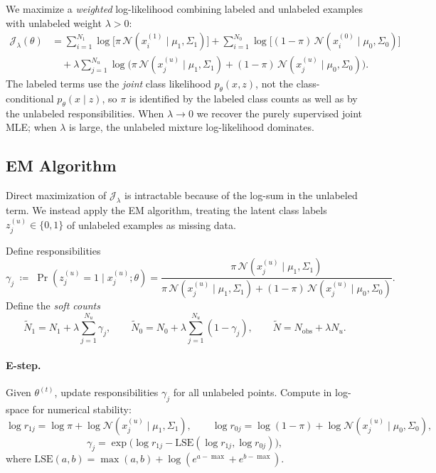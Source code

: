 \documentclass[11pt]{article}
\theoremstyle{definition}
\newcommand{\calJ}{\mathcal{J}}
\newcommand{\calN}{\mathcal{N}}
\newcommand{\lam}{\lambda}
\newcommand{\Sig}{\Sigma}
\newcommand{\LSE}{\mathrm{LSE}}
\begin{document}
We maximize a \emph{weighted} log-likelihood combining labeled
and unlabeled examples with unlabeled weight \(\lam>0\):
\begin{align}
\calJ_\lam(\theta)
&= \sum_{i=1}^{N_1}\log\!\Big[\pi\,\calN(x_i^{(1)}\mid \mu_1,\Sig_1)\Big]
 + \sum_{i=1}^{N_0}\log\!\Big[(1-\pi)\,\calN(x_i^{(0)}\mid \mu_0,\Sig_0)\Big] \nonumber\\
&\quad + \lam \sum_{j=1}^{N_u}\log\!\Big(
\pi\,\calN(x_j^{(u)}\mid \mu_1,\Sig_1) + (1-\pi)\,\calN(x_j^{(u)}\mid \mu_0,\Sig_0)
\Big). \label{eq:weighted-ll}
\end{align}
The labeled terms use the \emph{joint} class likelihood
\(p_\theta(x,z)\), not the class-conditional \(p_\theta(x\mid z)\),
so \(\pi\) is identified by the labeled class counts as well as by the
unlabeled responsibilities.
When \(\lam\!\to\!0\) we recover the purely supervised joint MLE;
when \(\lam\) is large, the unlabeled mixture log-likelihood dominates.

\subsection{EM Algorithm}

Direct maximization of \(\calJ_\lam\) is intractable because of the
log-sum in the unlabeled term.
We instead apply the EM algorithm, treating the latent class labels
\(z_j^{(u)}\in\{0,1\}\) of unlabeled examples as missing data.

Define responsibilities
\[
\gamma_j \;\coloneqq\; \Pr(z^{(u)}_j=1\mid x_j^{(u)};\theta)
= \frac{\pi\,\calN(x_j^{(u)}\mid \mu_1,\Sig_1)}
{\pi\,\calN(x_j^{(u)}\mid \mu_1,\Sig_1) + (1-\pi)\,\calN(x_j^{(u)}\mid \mu_0,\Sig_0)}.
\]
Define the \emph{soft counts}
\[
\widetilde{N}_1 = N_1 + \lam \sum_{j=1}^{N_u}\gamma_j,\qquad
\widetilde{N}_0 = N_0 + \lam \sum_{j=1}^{N_u}(1-\gamma_j),\qquad
\widetilde{N} = N_{\mathrm{obs}} + \lam N_u.
\]

\paragraph{E-step.}
Given \(\theta^{(t)}\), update responsibilities \(\gamma_j\) for all unlabeled
points.
Compute in log-space for numerical stability:
\[
\log r_{1j}=\log \pi + \log \calN(x_j^{(u)}\mid \mu_1,\Sig_1),\qquad
\log r_{0j}=\log (1-\pi) + \log \calN(x_j^{(u)}\mid \mu_0,\Sig_0),
\]
\[
\gamma_j = \exp\big(\log r_{1j} - \LSE(\log r_{1j},\log r_{0j})\big),
\]
where \(\LSE(a,b)=\max(a,b)+\log(e^{a-\max}+e^{b-\max})\).
\end{document}

